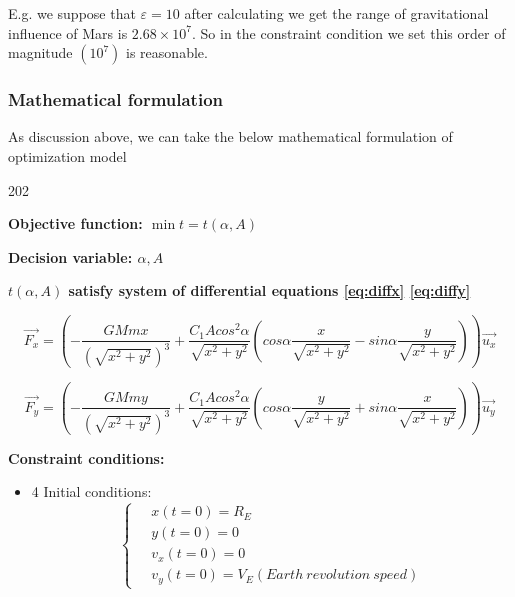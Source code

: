 \documentclass[../Paper.tex]{subfiles}
\begin{document}
E.g. we suppose that $\varepsilon = 10$ after calculating we get the range of gravitational influence of Mars 
is $2.68 \times 10^{7} $. So in the constraint condition we set this  order of magnitude $(10^7)$ is reasonable.

\subsubsection{Mathematical formulation}
As discussion above, we can take the below mathematical formulation of optimization model

\begin{dingautolist}{202}

\item \textbf{Objective function: $ \min{t = t(\alpha,A)} $ }

\item \textbf{Decision variable: $ \alpha , A $ }  

\item \textbf{$t(\alpha,A)$ satisfy system of differential equations \eqref{eq:diffx} \eqref{eq:diffy} }

\begin{equation*}
\vec{F_x} = (-\frac{GMmx}{(\sqrt{x^2+y^2})^3} + \dfrac{C_{1} A cos^2 \alpha}{\sqrt{x^2+y^2}} (cos\alpha\frac{x}{\sqrt{x^2+y^2}} - sin\alpha\frac{y}{\sqrt{x^2+y^2}}))\vec{u_x}
\end{equation*}

\begin{equation*}
\vec{F_y} = (-\frac{GMmy}{(\sqrt{x^2+y^2})^3} + \dfrac{C_{1} A cos^2 \alpha}{\sqrt{x^2+y^2}} (cos\alpha\frac{y}{\sqrt{x^2+y^2}} + sin\alpha\frac{x}{\sqrt{x^2+y^2}}))\vec{u_y}
\end{equation*}

\item \textbf{Constraint conditions:}

\begin{itemize}
	\item 

4 Initial conditions:
\begin{equation*}
\left\{\begin{array}{ll}
~& x(t=0) = R_{E}\\[2mm]
~& y(t=0) = 0 \\[2mm]
~& v_{x}(t=0) = 0 \\[2mm]
~& v_{y}(t=0) = V_{E}(Earth~revolution~speed) 
\end{array}\right.
\end{equation*}


\end{itemize}
\end{dingautolist}
\end{document}
